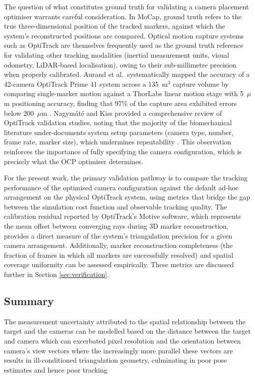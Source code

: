 The question of what constitutes ground truth for validating a camera placement optimiser warrants careful consideration. In \gls{MoCap}, ground truth refers to the true three-dimensional position of the tracked markers, against which the system's reconstructed positions are compared. Optical motion capture systems such as OptiTrack are themselves frequently used as the ground truth reference for validating other tracking modalities (inertial measurement units, visual odometry, LiDAR-based localisation), owing to their sub-millimetre precision when properly calibrated. Aurand et al.\ systematically mapped the accuracy of a 42-camera OptiTrack Prime 41 system across a 135~m$^3$ capture volume by comparing single-marker motion against a ThorLabs linear motion stage with 5~$\mu$m positioning accuracy, finding that 97\% of the capture area exhibited errors below 200~$\mu$m \parencite{aurandAccuracyMapOptical2017}. Nagymáté and Kiss provided a comprehensive review of OptiTrack validation studies, noting that the majority of the biomechanical literature under-documents system setup parameters (camera type, number, frame rate, marker size), which undermines repeatability \parencite{nagymate2018optitrack}. This observation reinforces the importance of fully specifying the camera configuration, which is precisely what the \gls{OCP} optimiser determines.

For the present work, the primary validation pathway is to compare the tracking performance of the optimised camera configuration against the default ad-hoc arrangement on the physical OptiTrack system, using metrics that bridge the gap between the simulation cost function and observable tracking quality. The calibration residual reported by OptiTrack's Motive software, which represents the mean offset between converging rays during 3D marker reconstruction, provides a direct measure of the system's triangulation precision for a given camera arrangement. Additionally, marker reconstruction completeness (the fraction of frames in which all markers are successfully resolved) and spatial coverage uniformity can be assessed empirically. These metrics are discussed further in Section \ref{sec:verification}.


\subsection{Summary}

The measurement uncertainty attributed to the spatial relationship between the target and the cameras can be modelled based on the distance between the target and camera which can excerbated pixel resolution and the orientation between camera's view vectors where the increasingly more parallel these vectors are results in ill-conditioned triangulation geometry, culminating in poor pose estimates and hence poor tracking

